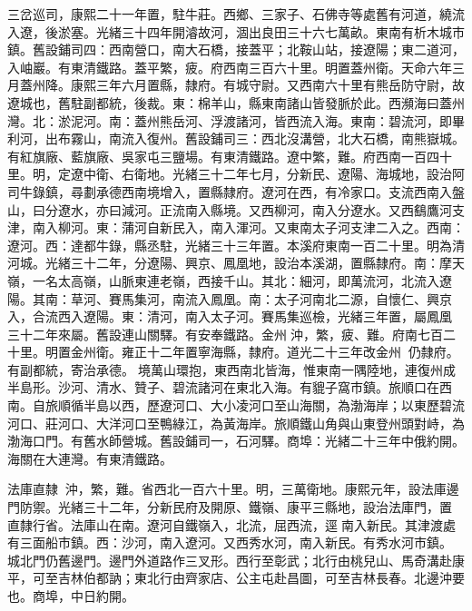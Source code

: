\begin{pinyinscope}
三岔巡司，康熙二十一年置，駐牛莊。西鄉、三家子、石佛寺等處舊有河道，繞流入遼，後淤塞。光緒三十四年開濬故河，涸出良田三十六七萬畝。東南有析木城市鎮。舊設鋪司四：西南營口，南大石橋，接蓋平；北鞍山站，接遼陽；東二道河，入岫巖。有東清鐵路。蓋平繁，疲。府西南三百六十里。明置蓋州衛。天命六年三月蓋州降。康熙三年六月置縣，隸府。有城守尉。又西南六十里有熊岳防守尉，故遼城也，舊駐副都統，後裁。東：棉羊山，縣東南諸山皆發脈於此。西瀕海曰蓋州灣。北：淤泥河。南：蓋州熊岳河、浮渡諸河，皆西流入海。東南：碧流河，即畢利河，出布霧山，南流入復州。舊設鋪司三：西北沒溝營，北大石橋，南熊嶽城。有紅旗廠、藍旗廠、吳家屯三鹽場。有東清鐵路。遼中繁，難。府西南一百四十里。明，定遼中衛、右衛地。光緒三十二年七月，分新民、遼陽、海城地，設治阿司牛錄鎮，尋劃承德西南境增入，置縣隸府。遼河在西，有冷家口。支流西南入盤山，曰分遼水，亦曰減河。正流南入縣境。又西柳河，南入分遼水。又西鷂鷹河支津，南入柳河。東：蒲河自新民入，南入渾河。又東南太子河支津二入之。西南：遼河。西：達都牛錄，縣丞駐，光緒三十三年置。本溪府東南一百二十里。明為清河城。光緒三十二年，分遼陽、興京、鳳凰地，設治本溪湖，置縣隸府。南：摩天嶺，一名太高嶺，山脈東連老嶺，西接千山。其北：細河，即萬流河，北流入遼陽。其南：草河、賽馬集河，南流入鳳凰。南：太子河南北二源，自懷仁、興京入，合流西入遼陽。東：清河，南入太子河。賽馬集巡檢，光緒三年置，屬鳳凰，三十二年來屬。舊設連山關驛。有安奉鐵路。金州沖，繁，疲、難。府南七百二十里。明置金州衛。雍正十二年置寧海縣，隸府。道光二十三年改金州，仍隸府。有副都統，寄治承德。境萬山環抱，東西南北皆海，惟東南一隅陸地，連復州成半島形。沙河、清水、贊子、碧流諸河在東北入海。有貔子窩市鎮。旅順口在西南。自旅順循半島以西，歷遼河口、大小凌河口至山海關，為渤海岸；以東歷碧流河口、莊河口、大洋河口至鴨綠江，為黃海岸。旅順鐵山角與山東登州頭對峙，為渤海口門。有舊水師營城。舊設鋪司一，石河驛。商埠：光緒二十三年中俄約開。海關在大連灣。有東清鐵路。

法庫直隸：沖，繁，難。省西北一百六十里。明，三萬衛地。康熙元年，設法庫邊門防禦。光緒三十二年，分新民府及開原、鐵嶺、康平三縣地，設治法庫門，置，直隸行省。法庫山在南。遼河自鐵嶺入，北流，屈西流，逕南入新民。其津渡處有三面船市鎮。西：沙河，南入遼河。又西秀水河，南入新民。有秀水河市鎮。城北門仍舊邊門。邊門外道路作三叉形。西行至彰武；北行由桃兒山、馬奇溝赴康平，可至吉林伯都訥；東北行由齊家店、公主屯赴昌圖，可至吉林長春。北邊沖要也。商埠，中日約開。


\end{pinyinscope}
